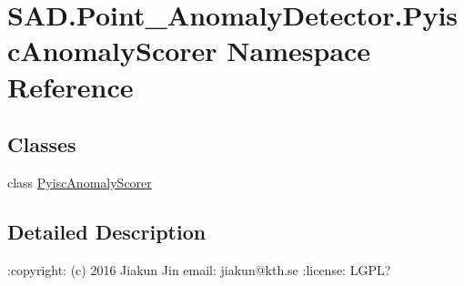 \hypertarget{namespaceSAD_1_1Point__AnomalyDetector_1_1PyiscAnomalyScorer}{}\section{S\+A\+D.\+Point\+\_\+\+Anomaly\+Detector.\+Pyisc\+Anomaly\+Scorer Namespace Reference}
\label{namespaceSAD_1_1Point__AnomalyDetector_1_1PyiscAnomalyScorer}
\subsection*{Classes}
\begin{DoxyCompactItemize}
\item 
class \hyperlink{classSAD_1_1Point__AnomalyDetector_1_1PyiscAnomalyScorer_1_1PyiscAnomalyScorer}{Pyisc\+Anomaly\+Scorer}
\end{DoxyCompactItemize}


\subsection{Detailed Description}
\begin{DoxyVerb}:copyright: (c) 2016 Jiakun Jin
email: jiakun@kth.se
:license: LGPL?
\end{DoxyVerb}
 